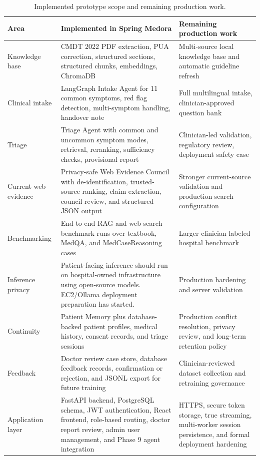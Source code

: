 \begin{table}[htbp]
\centering
\caption{Implemented prototype scope and remaining production work.}
\label{tab:implemented_scope}
\begin{tabular}{p{} p{} p{}}
\toprule
\textbf{Area} & \textbf{Implemented in Spring Medora} & \textbf{Remaining production work}\\
\midrule
Knowledge base & CMDT 2022 PDF extraction, PUA correction, structured sections, structured chunks, embeddings, ChromaDB & Multi-source local knowledge base and automatic guideline refresh\\
Clinical intake & LangGraph Intake Agent for 11 common symptoms, red flag detection, multi-symptom handling, handover note & Full multilingual intake, clinician-approved question bank\\
Triage & Triage Agent with common and uncommon symptom modes, retrieval, reranking, sufficiency checks, provisional report & Clinician-led validation, regulatory review, deployment safety case\\
Current web evidence & Privacy-safe Web Evidence Council with de-identification, trusted-source ranking, claim extraction, council review, and structured JSON output & Stronger current-source validation and production search configuration\\
Benchmarking & End-to-end RAG and web search benchmark runs over textbook, MedQA, and MedCaseReasoning cases & Larger clinician-labeled hospital benchmark\\
Inference privacy & Patient-facing inference should run on hospital-owned infrastructure using open-source models. EC2/Ollama deployment preparation has started. & Production hardening and server validation\\
Continuity & Patient Memory plus database-backed patient profiles, medical history, consent records, and triage sessions & Production conflict resolution, privacy review, and long-term retention policy\\
Feedback & Doctor review case store, database feedback records, confirmation or rejection, and JSONL export for future training & Clinician-reviewed dataset collection and retraining governance\\
Application layer & FastAPI backend, PostgreSQL schema, JWT authentication, React frontend, role-based routing, doctor report review, admin user management, and Phase 9 agent integration & HTTPS, secure token storage, true streaming, multi-worker session persistence, and formal deployment hardening\\
\bottomrule
\end{tabular}
\end{table}


